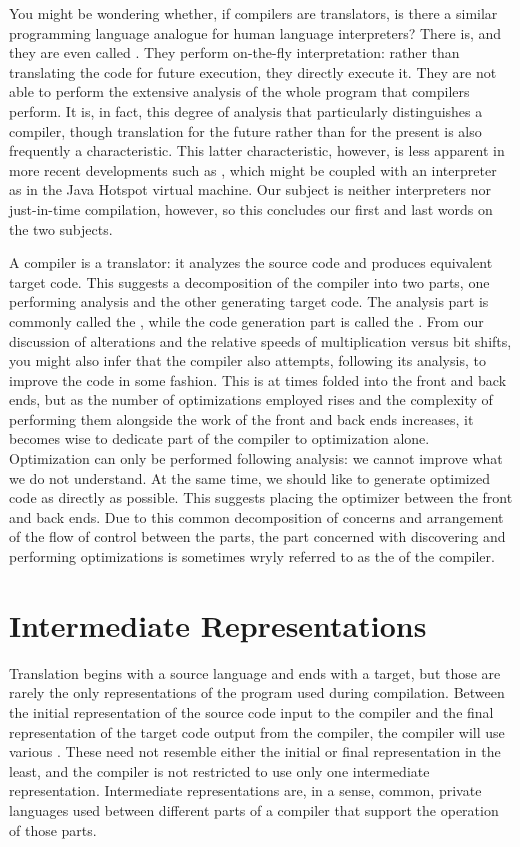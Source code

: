 You might be wondering whether, if compilers are translators, is there a similar programming language analogue for human language interpreters? There is, and they are even called . They perform on-the-fly interpretation: rather than translating the code for future execution, they directly execute it. They are not able to perform the extensive analysis of the whole program that compilers perform. It is, in fact, this degree of analysis that particularly distinguishes a compiler, though translation for the future rather than for the present is also frequently a characteristic. This latter characteristic, however, is less apparent in more recent developments such as , which might be coupled with an interpreter as in the Java Hotspot virtual machine. Our subject is neither interpreters nor just-in-time compilation, however, so this concludes our first and last words on the two subjects.

A compiler is a translator: it analyzes the source code and produces equivalent target code. This suggests a decomposition of the compiler into two parts, one performing analysis and the other generating target code. The analysis part is commonly called the , while the code generation part is called the . From our discussion of alterations and the relative speeds of multiplication versus bit shifts, you might also infer that the compiler also attempts, following its analysis, to improve the code in some fashion. This  is at times folded into the front and back ends, but as the number of optimizations employed rises and the complexity of performing them alongside the work of the front and back ends increases, it becomes wise to dedicate part of the compiler to optimization alone. Optimization can only be performed following analysis: we cannot improve what we do not understand. At the same time, we should like to generate optimized code as directly as possible. This suggests placing the optimizer between the front and back ends. Due to this common decomposition of concerns and arrangement of the flow of control between the parts, the part concerned with discovering and performing optimizations is sometimes wryly referred to as the  of the compiler.

\section{Intermediate Representations}
Translation begins with a source language and ends with a target, but those are rarely the only representations of the program used during compilation. Between the initial representation of the source code input to the compiler and the final representation of the target code output from the compiler, the compiler will use various . These need not resemble either the initial or final representation in the least, and the compiler is not restricted to use only one intermediate representation. Intermediate representations are, in a sense, common, private languages used between different parts of a compiler that support the operation of those parts.

